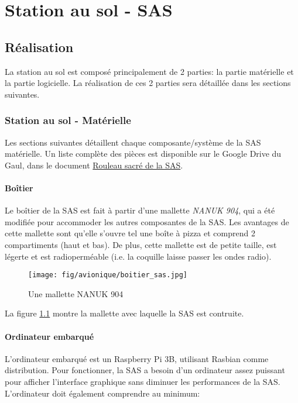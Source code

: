 \chapter{Station au sol - SAS}
\label{chap:sas}

\section{Réalisation}

La station au sol est composé principalement de 2 parties: la partie matérielle
et la partie logicielle. La réalisation de ces 2 parties sera détaillée dans
les sections suivantes.

\subsection{Station au sol - Matérielle}

Les sections suivantes détaillent chaque composante/système de la SAS
matérielle. Un liste complète des pièces est disponible sur le Google Drive du
Gaul, dans le document \href{https://drive.google.com/open?id=1WfV-Swc37Ih476rmRLYdwrBWRaUo8ZzXshS-LzYTQF4}{Rouleau sacré de la SAS}.

\subsubsection{Boîtier}

Le boîtier de la SAS est fait à partir d'une mallette \textit{NANUK 904}, qui a
été modifiée pour accommoder les autres composantes de la SAS. Les avantages de
cette mallette sont qu'elle s'ouvre tel une boîte à pizza et comprend 2
compartiments (haut et bas). De plus, cette mallette est de petite taille, est
légerte et est radioperméable (i.e. la coquille laisse passer les ondes radio).

\begin{figure}[H]
	\center
	\texttt{[image: fig/avionique/boitier\_sas.jpg]}
	\caption{Une mallette NANUK 904}
	\label{f:boitier_sas}
\end{figure}

La figure \ref{f:boitier_sas} montre la mallette avec laquelle la SAS est
contruite.

\subsubsection{Ordinateur embarqué}

L'ordinateur embarqué est un Raspberry Pi 3B, utilisant Rasbian comme
distribution. Pour fonctionner, la SAS a besoin d'un ordinateur assez puissant
pour afficher l'interface graphique sans diminuer les performances de la SAS.
L'ordinateur doit également comprendre au minimum:

